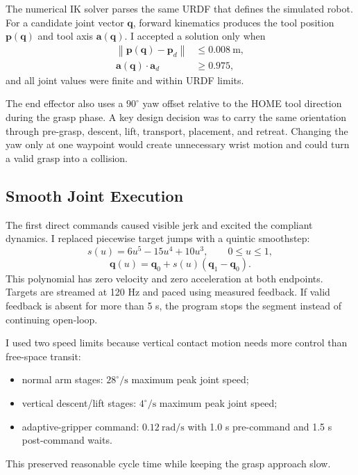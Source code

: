\documentclass[UTF8,zihao=-4,scheme=chinese,fontset=none]{ctexart}
\begin{document}
The numerical IK solver parses the same URDF that defines the simulated robot. For a candidate joint vector $\mathbf{q}$, forward kinematics produces the tool position $\mathbf{p}(\mathbf{q})$ and tool axis $\mathbf{a}(\mathbf{q})$. I accepted a solution only when
\begin{align}
\left\|\mathbf{p}(\mathbf{q})-\mathbf{p}_{d}\right\| &\leq 0.008\ \mathrm{m},\\
\mathbf{a}(\mathbf{q})\cdot\mathbf{a}_{d} &\geq 0.975,
\end{align}
and all joint values were finite and within URDF limits.

The end effector also uses a $90^{\circ}$ yaw offset relative to the HOME tool direction during the grasp phase. A key design decision was to carry the same orientation through pre-grasp, descent, lift, transport, placement, and retreat. Changing the yaw only at one waypoint would create unnecessary wrist motion and could turn a valid grasp into a collision.

\subsection{Smooth Joint Execution}

The first direct commands caused visible jerk and excited the compliant dynamics. I replaced piecewise target jumps with a quintic smoothstep:
\begin{equation}
s(u)=6u^{5}-15u^{4}+10u^{3},\qquad 0\leq u\leq1,
\end{equation}
\begin{equation}
\mathbf{q}(u)=\mathbf{q}_{0}+s(u)(\mathbf{q}_{1}-\mathbf{q}_{0}).
\end{equation}
This polynomial has zero velocity and zero acceleration at both endpoints. Targets are streamed at 120 Hz and paced using measured feedback. If valid feedback is absent for more than 5 s, the program stops the segment instead of continuing open-loop.

I used two speed limits because vertical contact motion needs more control than free-space transit:
\begin{itemize}
\item normal arm stages: $28^{\circ}/\mathrm{s}$ maximum peak joint speed;
\item vertical descent/lift stages: $4^{\circ}/\mathrm{s}$ maximum peak joint speed;
\item adaptive-gripper command: $0.12\ \mathrm{rad}/\mathrm{s}$ with 1.0 s pre-command and 1.5 s post-command waits.
\end{itemize}
This preserved reasonable cycle time while keeping the grasp approach slow.
\end{document}
